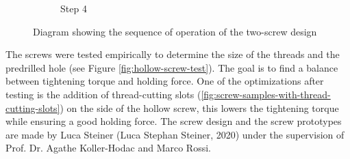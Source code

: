 \begin{figure}[!h]
\begin{subfigure}[b]{0.49\textwidth}
        \caption*{Step 4}
    \end{subfigure}
    \caption{Diagram showing the sequence of operation of the two-screw design}
    \label{fig:two-screw-operation}
\end{figure}

\FloatBarrier

The screws were tested empirically to determine the size of the threads and the predrilled hole (see Figure \ref{fig:hollow-screw-test}). The goal is to find a balance between tightening torque and holding force. One of the optimizations after testing is the addition of thread-cutting slots (\ref{fig:screw-samples-with-thread-cutting-slots}) on the side of the hollow screw, this lowers the tightening torque while ensuring a good holding force. 
The screw design and the screw prototypes are made by Luca Steiner (Luca Stephan Steiner, 2020) under the supervision of Prof. Dr. Agathe Koller-Hodac and Marco Rossi.

